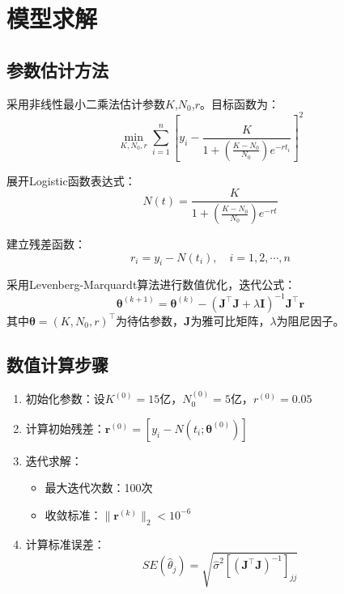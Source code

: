 \section{模型求解}

\subsection{参数估计方法}
采用非线性最小二乘法估计参数$K$,$N_0$,$r$。目标函数为：
\begin{equation}
\min_{K,N_0,r}\sum_{i=1}^{n}\left[y_i-\frac{K}{1+\left(\frac{K-N_0}{N_0}\right)e^{-rt_i}}\right]^2
\end{equation}

展开Logistic函数表达式：
\begin{equation}
N(t) = \frac{K}{1 + \left(\frac{K - N_0}{N_0}\right)e^{-rt}}
\end{equation}

建立残差函数：
\begin{equation}
r_i = y_i - N(t_i),\quad i=1,2,\cdots,n
\end{equation}

采用Levenberg-Marquardt算法进行数值优化，迭代公式：
\begin{equation}
\boldsymbol{\theta}^{(k+1)} = \boldsymbol{\theta}^{(k)} - (\mathbf{J}^\top\mathbf{J} + \lambda \mathbf{I})^{-1}\mathbf{J}^\top\mathbf{r}
\end{equation}
其中$\boldsymbol{\theta} = (K, N_0, r)^\top$为待估参数，$\mathbf{J}$为雅可比矩阵，$\lambda$为阻尼因子。

\subsection{数值计算步骤}
\begin{enumerate}
\item 初始化参数：设$K^{(0)} = 15$亿，$N_0^{(0)} = 5$亿，$r^{(0)} = 0.05$
\item 计算初始残差：$\mathbf{r}^{(0)} = [y_i - N(t_i;\boldsymbol{\theta}^{(0)})]$
\item 迭代求解：
\begin{itemize}
\item 最大迭代次数：100次
\item 收敛标准：$\|\mathbf{r}^{(k)}\|_2 < 10^{-6}$
\end{itemize}
\item 计算标准误差：
\begin{equation}
SE(\hat{\theta}_j) = \sqrt{\hat{\sigma}^2 [(\mathbf{J}^\top\mathbf{J})^{-1}]_{jj}}
\end{equation}
\end{enumerate}

